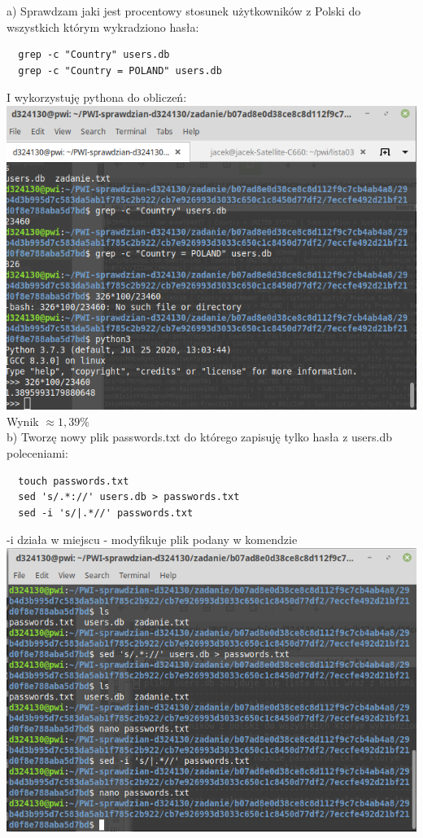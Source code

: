 \documentclass{article}
\begin{document}
\begin{enumerate}
a) Sprawdzam jaki jest procentowy stosunek użytkowników z Polski do wszystkich którym wykradziono hasła:
 \begin{verbatim}
  grep -c "Country" users.db
  grep -c "Country = POLAND" users.db 
 \end{verbatim}
 I wykorzystuję pythona do obliczeń:\\
 \includegraphics[scale=0.4]{zadanie.png}\\
 Wynik $\approx 1,39 \%$
 \\b) Tworzę nowy plik passwords.txt do którego zapisuję tylko hasła z users.db poleceniami:
 \begin{verbatim}
  touch passwords.txt
  sed 's/.*://' users.db > passwords.txt
  sed -i 's/|.*//' passwords.txt
 \end{verbatim}
 -i działa w miejscu - modyfikuje plik podany w komendzie\cite{sed}\\
 \includegraphics[scale=0.4]{passwords.png}\vspace{0.3cm}\\

\end{enumerate}
\end{document}
